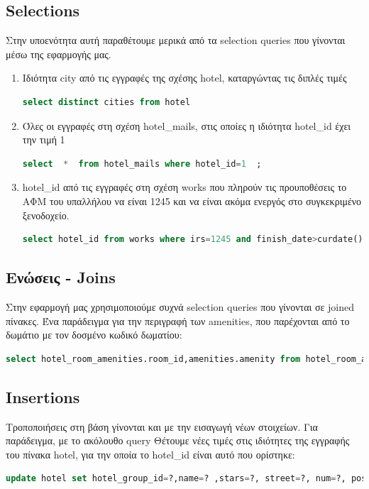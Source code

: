 \documentclass[a4paper,oneside, 11pt]{article}
\begin{document}
\subsection{Selections}
Στην υποενότητα αυτή παραθέτουμε μερικά από τα selection queries που γίνονται μέσω της εφαρμογής μας.
\begin{enumerate}
\item Ιδιότητα city από τις εγγραφές της σχέσης hotel, καταργώντας τις διπλές τιμές \bigbreak 
\begin{lstlisting}[language=SQL]
select distinct cities from hotel
\end{lstlisting}
\item Όλες οι εγγραφές στη σχέση hotel\_mails, στις οποίες η ιδιότητα hotel\_id έχει την τιμή 1 \bigbreak
\begin{lstlisting}[language=SQL]
select  *  from hotel_mails where hotel_id=1  ;
\end{lstlisting}
\item hotel\_id από τις εγγραφές στη σχέση works που πληρούν τις προυποθέσεις το ΑΦΜ του υπαλλήλου να είναι 1245 και να είναι ακόμα ενεργός στο συγκεκριμένο ξενοδοχείο. \bigbreak
\begin{lstlisting}[language=SQL]
select hotel_id from works where irs=1245 and finish_date>curdate();
\end{lstlisting}
\end{enumerate}
\subsection{Ενώσεις - Joins}
Στην εφαρμογή μας χρησιμοποιούμε συχνά selection queries που γίνονται σε joined πίνακες. 
Ένα παράδειγμα για την περιγραφή των amenities, που παρέχονται από το δωμάτιο με τον δοσμένο κωδικό δωματίου:
\begin{lstlisting}[language=SQL]
select hotel_room_amenities.room_id,amenities.amenity from hotel_room_amenities inner join amenities on hotel_room_amenities.amenity_id=amenities.amenity_id where room_id=2
\end{lstlisting}

\subsection{Insertions}
Τροποποιήσεις στη βάση γίνονται και με την εισαγωγή νέων στοιχείων. Για παράδειγμα, με το ακόλουθο query Θέτουμε νέες τιμές στις ιδιότητες της εγγραφής του πίνακα hotel, για την οποία το hotel\_id είναι αυτό που ορίστηκε:
\begin{lstlisting}[language=SQL]
update hotel set hotel_group_id=?,name=? ,stars=?, street=?, num=?, postal_code=?, city=? where hotel_id=?;
\end{lstlisting}
\end{document}
